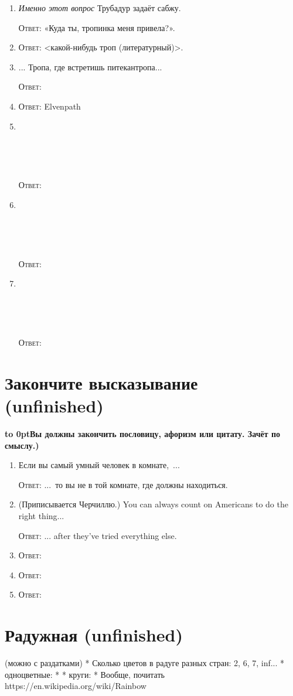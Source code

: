\documentclass[a4paper,10pt]{article}
\let\keyword\textsc
\newenvironment{topic}{\begin{enumerate}}{\end{enumerate}}
\newcommand{\question}[3]{\item[#1.] #2 \par \keyword{Ответ:} #3}
\newcommand{\topiccommentary}[1]{\begin{adjustwidth}{0.9cm}{} \vspace{-0.3em}\textbf{\hbox to 0pt{\hss{(}}#1)} \end{adjustwidth}}
\newcommand{\placeholder}{~\par~\par~}
\begin{document}
\begin{topic}
 \question{10}{\emph{Именно этот вопрос} Трубадур задаёт сабжу.}{«Куда ты, тропинка меня привела?».}
 \question{30--40}{}{<какой-нибудь троп (литературный)>.}
 \question{??}{... Тропа, где встретишь питекантропа...}{}
 \question{??}{}{Elvenpath}
 \question{??}{\placeholder}{}
 \question{??}{\placeholder}{}
 \question{??}{\placeholder}{}
\end{topic}


\section{Закончите высказывание (unfinished)}
\topiccommentary{Вы должны закончить пословицу, афоризм или цитату. Зачёт по смыслу.}

\begin{topic}
 \question{??}{Если вы самый умный человек в комнате,~...}{...~то вы не в той комнате, где должны находиться.}
 \question{??}{(Приписывается Черчиллю.) You can always count on Americans to do the right thing...}{... after they’ve tried everything else.}
 \question{??}{}{}
 \question{??}{}{}
 \question{??}{}{}
\end{topic}


\section{Радужная (unfinished)}
(можно с раздатками)
* Сколько цветов в радуге разных стран: 2, 6, 7, inf...
* одноцветные:
*
* круги:
*
Вообще, почитать https://en.wikipedia.org/wiki/Rainbow
\end{document}
